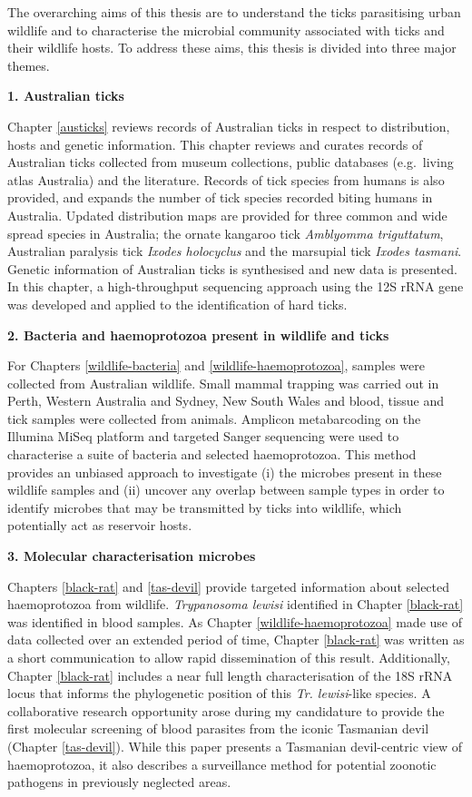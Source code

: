 \documentclass[a4paper, nobind]{templates/ociamthesis}
\begin{document}
The overarching aims of this thesis are to understand the ticks parasitising urban wildlife and to characterise the microbial community associated with ticks and their wildlife hosts. To address these aims, this thesis is divided into three major themes.

\textbf{1. Australian ticks}

Chapter \ref{austicks} reviews records of Australian ticks in respect to distribution, hosts and genetic information.
This chapter reviews and curates records of Australian ticks collected from museum collections, public databases (e.g.~living atlas Australia) and the literature.
Records of tick species from humans is also provided, and expands the number of tick species recorded biting humans in Australia.
Updated distribution maps are provided for three common and wide spread species in Australia; the ornate kangaroo tick \emph{Amblyomma triguttatum}, Australian paralysis tick \emph{Ixodes holocyclus} and the marsupial tick \emph{Ixodes tasmani}.
Genetic information of Australian ticks is synthesised and new data is presented.
In this chapter, a high-throughput sequencing approach using the 12S rRNA gene was developed and applied to the identification of hard ticks.

\textbf{2. Bacteria and haemoprotozoa present in wildlife and ticks}

For Chapters \ref{wildlife-bacteria} and \ref{wildlife-haemoprotozoa}, samples were collected from Australian wildlife.
Small mammal trapping was carried out in Perth, Western Australia and Sydney, New South Wales and blood, tissue and tick samples were collected from animals.
Amplicon metabarcoding on the Illumina MiSeq platform and targeted Sanger sequencing were used to characterise a suite of bacteria and selected haemoprotozoa.
This method provides an unbiased approach to investigate (i) the microbes present in these wildlife samples and (ii) uncover any overlap between sample types in order to identify microbes that may be transmitted by ticks into wildlife, which potentially act as reservoir hosts.

\textbf{3. Molecular characterisation microbes}

Chapters \ref{black-rat} and \ref{tas-devil} provide targeted information about selected haemoprotozoa from wildlife.
\emph{Trypanosoma lewisi} identified in Chapter \ref{black-rat} was identified in blood samples.
As Chapter \ref{wildlife-haemoprotozoa} made use of data collected over an extended period of time, Chapter \ref{black-rat} was written as a short communication to allow rapid dissemination of this result.
Additionally, Chapter \ref{black-rat} includes a near full length characterisation of the 18S rRNA locus that informs the phylogenetic position of this \emph{Tr. lewisi}-like species.
A collaborative research opportunity arose during my candidature to provide the first molecular screening of blood parasites from the iconic Tasmanian devil (Chapter \ref{tas-devil}).
While this paper presents a Tasmanian devil-centric view of haemoprotozoa, it also describes a surveillance method for potential zoonotic pathogens in previously neglected areas.
\end{document}
